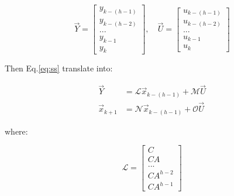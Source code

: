 \begin{equation}
    \vec{Y}  = \begin{bmatrix}
                y_{k-(h-1)} \\
                y_{k-(h-2)} \\
                ... \\
                y_{k-1} \\
                y_{k}
              \end{bmatrix}
    ,\quad
    \vec{U}  = \begin{bmatrix}
                u_{k-(h-1)} \\
                u_{k-(h-2)} \\
                ... \\
                u_{k-1} \\
                u_{k}
              \end{bmatrix}
\end{equation}

Then Eq.\ref{eq:ss} translate into:

\begin{equation}
    \begin{split}
        \vec{Y} &= \mathcal{L} \vec{x}_{k-(h-1)} + \mathcal{M} \vec{U} \\
        \vec{x}_{k+1} &= \mathcal{N} \vec{x}_{k-(h-1)} + \mathcal{O} \vec{U}
\end{split}
\end{equation}

where:

\begin{equation}
    \mathcal{L} = \begin{bmatrix}
                  C \\
                  CA \\
                  ... \\
                  CA^{h-2} \\
                  CA^{h-1}
                 \end{bmatrix}
\end{equation}

